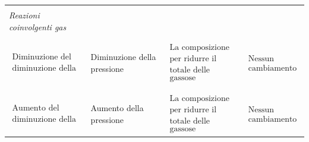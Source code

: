 \begin{center}
\begin{tabular}{|l|l|l|l|}
        &&&\\[-0.3cm]
        \hline
        &&&\\[-0.3cm]
        \textit{Reazioni coinvolgenti gas} &&&\\
        &&&\\[-0.3cm]
        \hline
        &&&\\[-0.3cm]
        \hspace{-0.17cm}$\begin{array}{l}
        \text{Diminuzione del volume,}\\
        \text{diminuzione della pressione} 
        \end{array}$ & Diminuzione della pressione & $\begin{array}{l}
        \text{La composizione cambia}\\
        \text{per ridurre il numero}\\
        \text{totale delle molecole}\\
        \text{gassose}
        \end{array}$ & \hspace{-0.17cm}$\begin{array}{l}
        \text{Nessun}\\
        \text{cambiamento} 
        \end{array}$\\
        &&&\\[-0.3cm]
        \hline
        &&&\\[-0.3cm]
        $\begin{array}{l}
        \text{Aumento del volume,}\\
        \text{diminuzione della pressione} 
        \end{array}$ & Aumento della pressione & $\begin{array}{l}
        \text{La composizione cambia}\\
        \text{per ridurre il numero}\\
        \text{totale delle molecole}\\
        \text{gassose}
        \end{array}$ & \hspace{-0.17cm}$\begin{array}{l}
        \text{Nessun}\\
        \text{cambiamento} 
        \end{array}$\\[0.45cm]
        \hline
    \end{tabular}
    \end{center}

